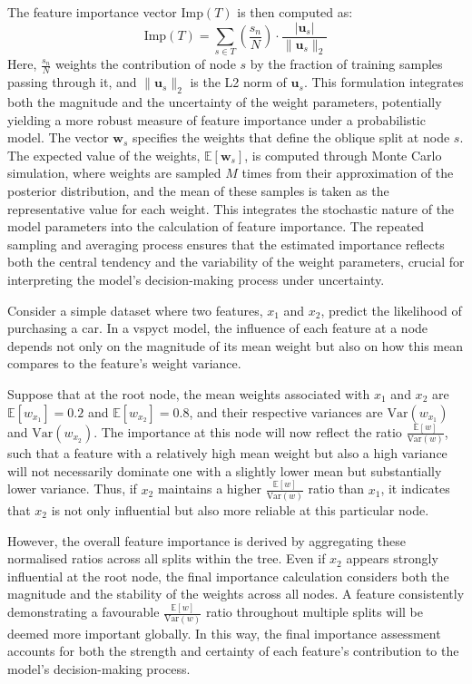 \documentclass[3p,review,authoryear]{elsarticle}
\begin{document}
The feature importance vector \(\text{Imp}(T)\) is then computed as:
\begin{equation}\label{eq:fimp}
\text{Imp}(T) = \sum_{s \in T} \left( \frac{s_n}{N} \right) \cdot \frac{|\mathbf{u}_s|}{\|\mathbf{u}_s\|_2}
\end{equation}
Here, \(\frac{s_n}{N}\) weights the contribution of node \(s\) by the fraction of training samples passing through it, and \(\|\mathbf{u}_s\|_2\) is the L2 norm of \(\mathbf{u}_s\).
This formulation integrates both the magnitude and the uncertainty of the weight parameters, potentially yielding a more robust measure of feature importance under a probabilistic model.
The vector $\mathbf{w}_s$ specifies the weights that define the oblique split at node $s$.
The expected value of the weights, $\mathbb{E}[\mathbf{w}_s]$, is computed through Monte Carlo simulation, where weights are sampled $M$ times from their approximation of the posterior distribution, and the mean of these samples is taken as the representative value for each weight.
This integrates the stochastic nature of the model parameters into the calculation of feature importance.
The repeated sampling and averaging process ensures that the estimated importance reflects both the central tendency and the variability of the weight parameters, crucial for interpreting the model's decision-making process under uncertainty.

Consider a simple dataset where two features, $x_1$ and $x_2$, predict the likelihood of purchasing a car.
In a \gls{vspyct} model, the influence of each feature at a node depends not only on the magnitude of its mean weight but also on how this mean compares to the feature’s weight variance.

Suppose that at the root node, the mean weights associated with $x_1$ and $x_2$ are \( \mathbb{E}[w_{x_1}] = 0.2 \) and \( \mathbb{E}[w_{x_2}] = 0.8 \), and their respective variances are \( \text{Var}(w_{x_1}) \) and \( \text{Var}(w_{x_2}) \).
The importance at this node will now reflect the ratio \( \frac{\mathbb{E}[w]}{\text{Var}(w)} \), such that a feature with a relatively high mean weight but also a high variance will not necessarily dominate one with a slightly lower mean but substantially lower variance.
Thus, if $x_2$ maintains a higher \(\frac{\mathbb{E}[w]}{\text{Var}(w)}\) ratio than $x_1$, it indicates that $x_2$ is not only influential but also more reliable at this particular node.

However, the overall feature importance is derived by aggregating these normalised ratios across all splits within the tree.
Even if $x_2$ appears strongly influential at the root node, the final importance calculation considers both the magnitude and the stability of the weights across all nodes.
A feature consistently demonstrating a favourable \(\frac{\mathbb{E}[w]}{\text{Var}(w)}\) ratio throughout multiple splits will be deemed more important globally.
In this way, the final importance assessment accounts for both the strength and certainty of each feature’s contribution to the model’s decision-making process.
\end{document}
